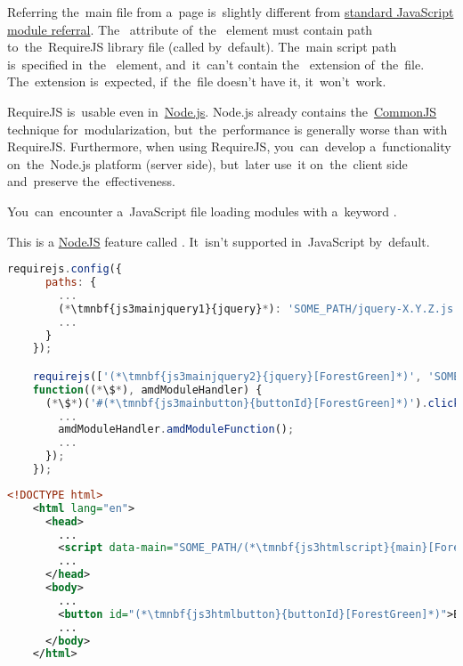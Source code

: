 Referring the~main file from a~page is~slightly different from \hyperref[javascriptmodularity]{standard JavaScript module referral}.
The~ attribute of~the~ element must contain path to~the~RequireJS library file (called  by~default).
The~main script path is~specified in~the~ element, and~it~can't contain the~ extension of~the~file.
The~extension is~expected, if~the~file doesn't have it, it~won't~work.

\note RequireJS is~usable even in~\hyperref[nodejs]{Node.js}.
Node.js already contains the~\hyperref[commonjs]{CommonJS} technique for~modularization, but~the~performance is generally worse than with RequireJS\@.
Furthermore, when using RequireJS, you~can~develop a~functionality on~the~Node.js platform (server side), but~later use~it on~the~client side and~preserve the~effectiveness.

\warning You~can~encounter a~JavaScript file loading modules with a~keyword .

This is a \hyperref[nodejs]{NodeJS} feature called \hyperref[commonjs]{}.
It~isn't supported in~JavaScript by~default.
\newpage

\begin{lstlisting}[language=JavaScript,title={Main JavaScript file \textit{\tmnbf{js3mainscript}{main}.js}}]
    requirejs.config({
      paths: {
        ...
        (*\tmnbf{js3mainjquery1}{jquery}*): 'SOME_PATH/jquery-X.Y.Z.js'
        ...
      }
    });

    requirejs(['(*\tmnbf{js3mainjquery2}{jquery}[ForestGreen]*)', 'SOME_PATH/amd_module'],
    function((*\$*), amdModuleHandler) {
      (*\$*)('#(*\tmnbf{js3mainbutton}{buttonId}[ForestGreen]*)').click(function() {
        ...
        amdModuleHandler.amdModuleFunction();
        ...
      });
    });
\end{lstlisting}
\begin{lstlisting}[language=XML,title={Web page file loading the JavaScript file}]
    <!DOCTYPE html>
    <html lang="en">
      <head>
        ...
        <script data-main="SOME_PATH/(*\tmnbf{js3htmlscript}{main}[ForestGreen]*)" src="SOME_OTHER_PATH/require.js"></script>
        ...
      </head>
      <body>
        ...
        <button id="(*\tmnbf{js3htmlbutton}{buttonId}[ForestGreen]*)">BUTTON_LABEL</button>
        ...
      </body>
    </html>
\end{lstlisting}
\newpage

